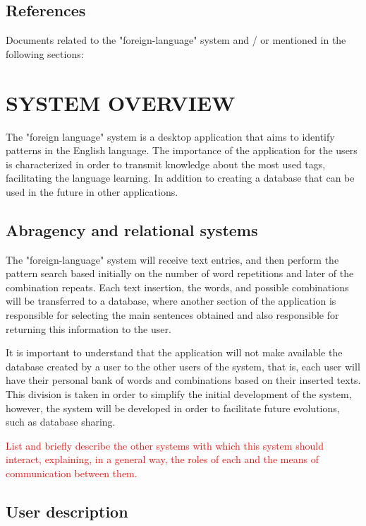 \documentclass[11pt, twoside, a4paper]{book}
\begin{document}
		\section{References}
				
				Documents related to the "foreign-language" system and / or mentioned in the following sections:
		
	\chapter{SYSTEM OVERVIEW}

		The "foreign language" system is a desktop application that aims to identify patterns in the English language.
The importance of the application for the users is characterized in order to transmit knowledge about the most used tags, facilitating the language learning. In addition to creating a database that can be used in the future in other applications.		
		
		\section{Abragency and relational systems}
		
			The "foreign-language" system will receive text entries, and then perform the pattern search based initially on the number of word repetitions and later of the combination repeats. Each text insertion, the words, and possible combinations will be transferred to a database, where another section of the application is responsible for selecting the main sentences obtained and also responsible for returning this information to the user.
			
			It is important to understand that the application will not make available the database created by a user to the other users of the system, that is, each user will have their personal bank of words and combinations based on their inserted texts. This division is taken in order to simplify the initial development of the system, however, the system will be developed in order to facilitate future evolutions, such as database sharing.
			  
  			\textcolor{Red}{List and briefly describe the other systems with which this system should interact, explaining, in a general way, the roles of each and the means of communication between them.}
  			
		\section{User description}
			
\end{document}
